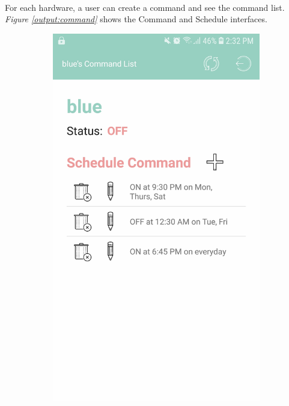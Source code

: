 \documentclass[12pt, oneside, a4paper]{book}
\begin{document}
		\paragraph{} For each hardware, a user can create a command and see the command list. \textit{Figure \ref{output:command}} shows the Command and Schedule interfaces. 
		\begin{figure}[H]
			\centering
			\begin{subfigure}[b]{.35\linewidth}
				\includegraphics[width=\linewidth]{img/output_command_list.jpg}

\end{subfigure}
\end{figure}
\end{document}
